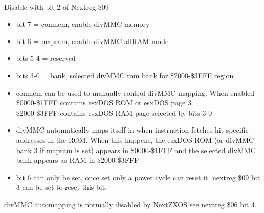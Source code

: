 \\     
Disable with bit 2 of Nextreg \$09
\begin{itemize}
\item[] bit 7 = conmem, enable divMMC memory
\item[] bit 6 = mapram, enable divMMC allRAM mode
\item[] bits 5-4 = reserved
\item[] bits 3-0 = bank, selected divMMC ram bank for \$2000-\$3FFF region
\item conmem can be used to manually control divMMC mapping. When enabled\\
\$0000-\$1FFF contains esxDOS ROM or esxDOS page 3\\
\$2000-\$3FFF contains esxDOS RAM page selected by bits 3-0
\item divMMC automatically maps itself in when instruction fetches hit
specific addresses in the ROM. When this happens, the esxDOS ROM (or divMMC
bank 3 if mapram is set) appears in \$0000-\$1FFF and the selected divMMC
bank appears as RAM in \$2000-\$3FFF
\item bit 6 can only be set, once set only a power cycle can reset it.
nextreg \$09 bit 3 can be set to reset this bit.
\end{itemize}
divMMC automapping is normally disabled by NextZXOS see nextreg \$06 bit 4.\\
